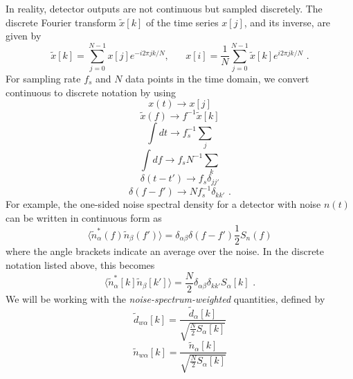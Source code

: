 \documentclass[11pt]{cuthesis}
\newcommand{\fs}{\text{ .}}
\begin{document}
In reality, detector outputs are not continuous but sampled discretely. The discrete Fourier transform $\tilde{x}[k]$ of the time series $x[j]$, and its inverse, are given by
\begin{equation}
\tilde{x}[k]=\sum^{N-1}_{j=0} x[j] e^{-i 2\pi jk/N}, \hspace{20pt}x[i]=\frac{1}{N}\sum^{N-1}_{j=0} \tilde{x}[k] e^{i2 \pi jk/N} \fs
\end{equation}
For sampling rate $f_s$ and $N$ data points in the time domain, we convert continuous to discrete notation by using
\begin{equation}
x(t)\rightarrow x[j]
\end{equation} 
\begin{equation}
\tilde{x}(f)\rightarrow f^{-1} \tilde{x}[k]
\end{equation} 
\begin{equation}
\int dt \rightarrow f_s^{-1}\sum_j
\end{equation} 
\begin{equation}
\int df \rightarrow f_s N^{-1} \sum_k
\end{equation} 
\begin{equation}
\delta(t-t')\rightarrow f_s \delta_{jj'}
\end{equation}
\begin{equation}
\delta(f-f')\rightarrow N f_s^{-1}\delta_{kk'} \fs
\end{equation}  
For example, the one-sided noise spectral density for a detector with noise $n(t)$ can be written in continuous form as
\begin{equation}
\langle  \tilde{n}^*_\alpha (f) \tilde{n}_\beta (f') \rangle = \delta_{\alpha \beta} \delta (f-f') \frac{1}{2} S_n (f)
\end{equation}
where the angle brackets indicate an average over the noise. In the discrete notation listed above, this becomes
\begin{equation}
\langle  \tilde{n}^*_\alpha [k] \tilde{n}_\beta [k']  \rangle = \frac{N}{2} \delta _{\alpha \beta} \delta _{k k'} S_\alpha [k] \fs
\end{equation}
We will be working with the \emph{noise-spectrum-weighted} quantities, defined by
\begin{equation}
\tilde{d}_{w\alpha}[k]=\frac{\tilde{d}_\alpha [k]}{\sqrt{\frac{N}{2}S_\alpha [k]}}
\end{equation}
\begin{equation}
\tilde{n}_{w\alpha}[k]=\frac{\tilde{n}_\alpha [k]}{\sqrt{\frac{N}{2}S_\alpha [k]}}
\end{equation}
\end{document}
